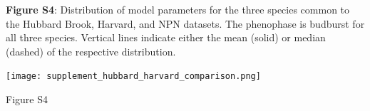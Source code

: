 \documentclass[a4paper,12pt]{article}
\begin{document}
\newpage

\textbf{Figure S4}: Distribution of model parameters for the three species common to the Hubbard Brook, Harvard, and NPN datasets. The phenophase is budburst for all three species. Vertical lines indicate either the mean (solid) or median (dashed) of the respective distribution.

\newpage

\begin{center}
	\centering
		\texttt{[image: supplement\_hubbard\_harvard\_comparison.png]}
	\caption{Figure S4}
\end{center}
\end{document}
